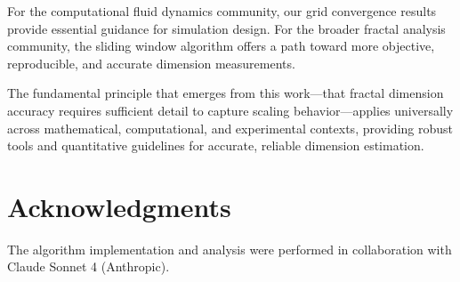 \documentclass[preprint,12pt]{elsarticle}
\begin{document}
For the computational fluid dynamics community, our grid convergence results provide essential guidance for simulation design. For the broader fractal analysis community, the sliding window algorithm offers a path toward more objective, reproducible, and accurate dimension measurements.

The fundamental principle that emerges from this work—that fractal dimension accuracy requires sufficient detail to capture scaling behavior—applies universally across mathematical, computational, and experimental contexts, providing robust tools and quantitative guidelines for accurate, reliable dimension estimation.

\section*{Acknowledgments}
The algorithm implementation and analysis were performed in collaboration with Claude Sonnet 4 (Anthropic).

\appendix


\end{document}
